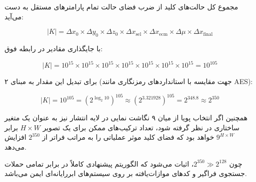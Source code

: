 مجموع کل حالت‌های کلید از ضرب فضای حالت تمام پارامترهای مستقل به دست می‌آید:

\begin{equation}
|K| = \Delta x_0 \times \Delta y_0 \times \Delta z_0 \times \Delta x_{\mathrm{sel}} \times \Delta x_{\mathrm{ecm}} \times \Delta \mu \times \Delta x_{\mathrm{final}}

\end{equation}

با جایگذاری مقادیر در رابطه فوق:

\begin{equation}
|K| = 10^{15} \times 10^{15} \times 10^{15} \times 10^{15} \times 10^{15} \times 10^{15} \times 10^{15} = 10^{105}

\end{equation}

برای تبدیل این مقدار به مبنای ۲ (جهت مقایسه با استانداردهای رمزنگاری مانند AES):

\begin{equation}
|K| = 10^{105} = (2^{\log_2 10})^{105} \approx (2^{3.321928})^{105} = 2^{348.8} \approx 2^{350}

\end{equation}

همچنین اگر انتخاب پویا از میان ۹ نگاشت نمایی در لایه انتشار نیز به عنوان یک متغیر ساختاری در نظر گرفته شود، تعداد ترکیب‌های ممکن برای یک تصویر $H \times W$ برابر $9^{H \times W}$ خواهد بود که فضای کلید موثر عملیاتی را به مراتب فراتر از $2^{350}$ افزایش می‌دهد. 

چون $2^{350} \gg 2^{128}$، اثبات می‌شود که الگوریتم پیشنهادی کاملاً در برابر تمامی حملات جستجوی فراگیر و کدهای موازات‌یافته بر روی سیستم‌های ابررایانه‌ای ایمن می‌باشد.

